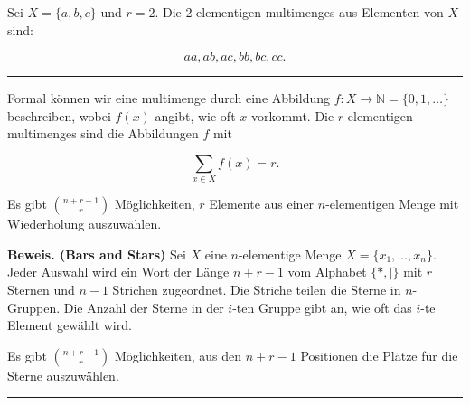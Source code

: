 \documentclass[9pt]{article}
\begin{document}
\begin{bsp}
Sei \( X = \{a, b, c\} \) und \( r = 2 \). Die 2-elementigen \glspl{multimenge} aus Elementen von \( X \) sind:

\[
aa, ab, ac, bb, bc, cc.
\]
\end{bsp} \noindent \rule{8cm}{0.4pt}
Formal können wir eine \gls{multimenge} durch eine Abbildung \( f : X \to \mathbb{N} = \{0, 1, \ldots\} \) beschreiben, wobei \( f(x) \) angibt, wie oft \( x \) vorkommt. Die \( r \)-elementigen \glspl{multimenge} sind die Abbildungen \( f \) mit

\[
\sum_{x \in X} f(x) = r.
\]
\begin{satz}Es gibt \(\binom{n + r - 1}{r}\) Möglichkeiten, \( r \) Elemente aus einer \( n \)-elementigen Menge mit Wiederholung auszuwählen.

\textbf{Beweis. (Bars and Stars)} Sei \( X \) eine \( n \)-elementige Menge \( X = \{x_1, \dots, x_n\} \).
Jeder Auswahl wird ein Wort der Länge \( n + r - 1 \) vom Alphabet \(\{ *, | \}\) mit \( r \) Sternen und \( n - 1 \) Strichen zugeordnet. Die Striche teilen die Sterne in \( n \)-Gruppen. Die Anzahl der Sterne in der \( i \)-ten Gruppe gibt an, wie oft das \( i \)-te Element gewählt wird. 

Es gibt \(\binom{n + r - 1}{r}\) Möglichkeiten, aus den \( n + r - 1 \) Positionen die Plätze für die Sterne auszuwählen.
 \end{satz} \label{satz:elem-mit-zurücklegen} \noindent \rule{8cm}{0.4pt}
\end{document}
